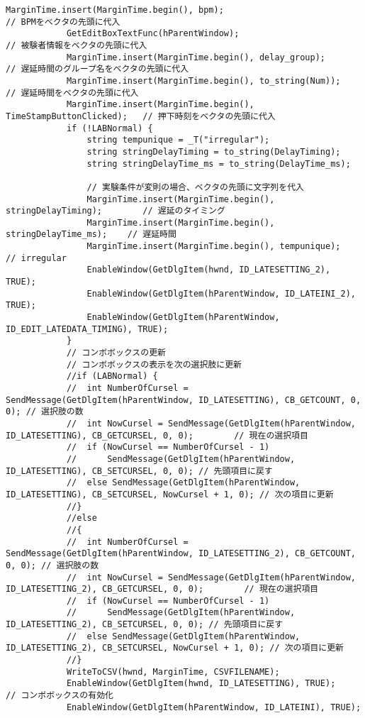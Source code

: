 \begin{lstlisting}[caption=main.cpp]
			MarginTime.insert(MarginTime.begin(), bpm);                                // BPMをベクタの先頭に代入
			GetEditBoxTextFunc(hParentWindow);                                            // 被験者情報をベクタの先頭に代入
			MarginTime.insert(MarginTime.begin(), delay_group);                     // 遅延時間のグループ名をベクタの先頭に代入
			MarginTime.insert(MarginTime.begin(), to_string(Num));                 // 遅延時間をベクタの先頭に代入
			MarginTime.insert(MarginTime.begin(), TimeStampButtonClicked);   // 押下時刻をベクタの先頭に代入
			if (!LABNormal) {
				string tempunique = _T("irregular");
				string stringDelayTiming = to_string(DelayTiming);
				string stringDelayTime_ms = to_string(DelayTime_ms);

				// 実験条件が変則の場合、ベクタの先頭に文字列を代入
				MarginTime.insert(MarginTime.begin(), stringDelayTiming);        // 遅延のタイミング
				MarginTime.insert(MarginTime.begin(), stringDelayTime_ms);    // 遅延時間
				MarginTime.insert(MarginTime.begin(), tempunique);                // irregular
				EnableWindow(GetDlgItem(hwnd, ID_LATESETTING_2), TRUE);
				EnableWindow(GetDlgItem(hParentWindow, ID_LATEINI_2), TRUE);
				EnableWindow(GetDlgItem(hParentWindow, ID_EDIT_LATEDATA_TIMING), TRUE);
			}
			// コンボボックスの更新
			// コンボボックスの表示を次の選択肢に更新
			//if (LABNormal) {
			//	int NumberOfCursel = SendMessage(GetDlgItem(hParentWindow, ID_LATESETTING), CB_GETCOUNT, 0, 0); // 選択肢の数
			//	int NowCursel = SendMessage(GetDlgItem(hParentWindow, ID_LATESETTING), CB_GETCURSEL, 0, 0);        // 現在の選択項目
			//	if (NowCursel == NumberOfCursel - 1)
			//		SendMessage(GetDlgItem(hParentWindow, ID_LATESETTING), CB_SETCURSEL, 0, 0); // 先頭項目に戻す
			//	else SendMessage(GetDlgItem(hParentWindow, ID_LATESETTING), CB_SETCURSEL, NowCursel + 1, 0); // 次の項目に更新
			//}
			//else
			//{
			//	int NumberOfCursel = SendMessage(GetDlgItem(hParentWindow, ID_LATESETTING_2), CB_GETCOUNT, 0, 0); // 選択肢の数
			//	int NowCursel = SendMessage(GetDlgItem(hParentWindow, ID_LATESETTING_2), CB_GETCURSEL, 0, 0);        // 現在の選択項目
			//	if (NowCursel == NumberOfCursel - 1)
			//		SendMessage(GetDlgItem(hParentWindow, ID_LATESETTING_2), CB_SETCURSEL, 0, 0); // 先頭項目に戻す
			//	else SendMessage(GetDlgItem(hParentWindow, ID_LATESETTING_2), CB_SETCURSEL, NowCursel + 1, 0); // 次の項目に更新
			//}
			WriteToCSV(hwnd, MarginTime, CSVFILENAME);
			EnableWindow(GetDlgItem(hwnd, ID_LATESETTING), TRUE);        // コンボボックスの有効化
			EnableWindow(GetDlgItem(hParentWindow, ID_LATEINI), TRUE);


\end{lstlisting}
